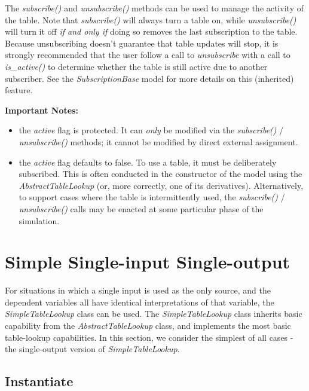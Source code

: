 \documentclass[11pt,fleqn]{report}
\begin{document}
The \textit{subscribe()} and \textit{unsubscribe()} methods can be used to
manage the activity of the table.  Note that \textit{subscribe()} will
always turn a table on, while \textit{unsubscribe()} will turn it off
\textit{if and only if}
doing so removes the last subscription to the table. Because unsubscribing
doesn't guarantee that table updates will stop, it is strongly recommended
that the user follow a call to \textit{unsubscribe} with a call to
\textit{is\_active()} to determine whether the table is still active due to
another subscriber.
See the \textit{SubscriptionBase} model for more details on this
(inherited) feature.

\textbf{Important Notes:}
\begin{itemize}
 \item the \textit{active} flag is protected.  It can \textit{only} be modified
       via the \textit{subscribe()} / \textit{unsubscribe()} methods;
       it cannot be modified by direct external assignment.
 \item the \textit{active} flag defaults to false.  To use a table, it must
       be deliberately subscribed.  This is often conducted in the
       constructor of the model using the \textit{AbstractTableLookup} (or,
       more correctly, one of its derivatives).
       Alternatively, to support cases where the table is intermittently used,
       the \textit{subscribe()} / \textit{unsubscribe()} calls may be enacted at
       some particular phase of the simulation.
\end{itemize}

\section{Simple Single-input Single-output} \label{sec:UG_single_single}
  For situations in which a single input is used as the only source,
  and the dependent variables all have identical interpretations of that
  variable, the \textit{SimpleTableLookup} class can be used.
  The \textit{SimpleTableLookup} class inherits basic capability from the
  \textit{AbstractTableLookup} class, and implements the most basic
  table-lookup capabilities.
In this section, we consider the simplest of all cases - the single-output
 version of \textit{SimpleTableLookup}.

\subsection{Instantiate}
\end{document}
